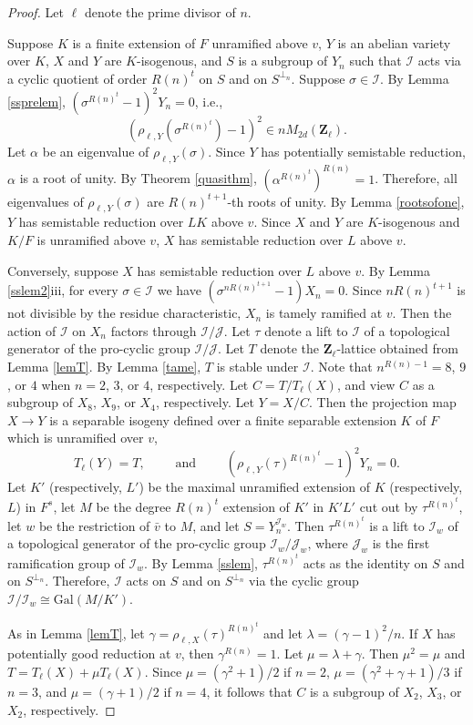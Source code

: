 \documentclass{amsart}
\def\Z{{\mathbf Z}}
\def\R{{\mathbf R}}
\def\Gal{\mathrm{Gal}}
\def\I{{\mathcal I}}
\def\J{{\mathcal J}}
\def\R{R}
\theoremstyle{definition}
\begin{document}
\begin{proof}
Let $\ell$ denote the prime divisor of $n$.

Suppose $K$ is a finite extension of $F$ unramified above $v$,
$Y$ is an abelian variety over $K$, $X$ and $Y$ are $K$-isogenous, and 
$S$ is a subgroup of $Y_n$ such that
$\I$ acts via a cyclic quotient of order $\R(n)^t$ on $S$ and 
on $S^{\perp_n}$. Suppose $\sigma \in \I$. 
By Lemma \ref{ssprelem}, $(\sigma^{\R(n)^t}-1)^2Y_n = 0$, i.e.,
$$(\rho_{\ell,Y}(\sigma^{\R(n)^t})-1)^2 \in nM_{2d}(\Z_\ell).$$
Let $\alpha$ be an eigenvalue of $\rho_{\ell,Y}(\sigma)$.
Since $Y$ has potentially semistable reduction, $\alpha$ is a root
of unity. 
By Theorem \ref{quasithm}, $(\alpha^{\R(n)^t})^{\R(n)} = 1$.
Therefore, all eigenvalues of $\rho_{\ell,Y}(\sigma)$ are 
${\R(n)}^{t+1}$-th
roots of unity. By Lemma \ref{rootsofone}, $Y$ has semistable reduction
over $LK$ above $v$. Since $X$ and $Y$ are $K$-isogenous and
$K/F$ is unramified above $v$, 
$X$ has semistable reduction over $L$ above $v$. 

Conversely, suppose $X$ has semistable reduction over $L$ above $v$.
By Lemma \ref{sslem2}iii, 
for every $\sigma \in \I$ we have
$(\sigma^{nR(n)^{t+1}}-1)X_n = 0$.
Since $nR(n)^{t+1}$ is 
not divisible by the residue characteristic, 
$X_n$ is tamely ramified at $v$. Then the
action of $\I$ on $X_n$ factors through $\I/\J$. 
Let $\tau$ denote a lift to $\I$ of a topological generator of the 
pro-cyclic group $\I/\J$. 
Let $T$ denote the $\Z_\ell$-lattice obtained from Lemma \ref{lemT}.
By Lemma \ref{tame}, $T$ is stable under $\I$. 
Note that $n^{R(n)-1} = 8$, $9$, or $4$ when
$n = 2$, $3$, or $4$, respectively.
Let $C = T/T_\ell(X)$, and 
view $C$ as a subgroup of 
$X_8$, $X_9$, or $X_4$, respectively. 
Let $Y = X/C$.
Then the projection map $X \to Y$ is a separable isogeny defined 
over a finite separable extension $K$ of $F$
which is unramified over $v$, 
$$T_\ell(Y) = T, \qquad \text{ and } \qquad 
(\rho_{\ell,Y}(\tau)^{\R(n)^t}-1)^2Y_n = 0.$$
Let $K'$ (respectively, $L'$) be the maximal unramified extension 
of $K$ (respectively, $L$) in $F^{s}$,  
let $M$ be the degree ${\R(n)^t}$ extension of $K'$ in $K'L'$ cut out by 
$\tau^{\R(n)^t}$, let $w$ be the restriction of ${\bar v}$ to $M$, 
and let $S = Y_n^{\I_w}$. 
Then $\tau^{\R(n)^t}$ is a lift to 
$\I_w$ of a topological generator of the pro-cyclic group
$\I_w/\J_w$, where $\J_w$ is the first ramification group of $\I_w$.
By Lemma \ref{sslem}, $\tau^{\R(n)^t}$ acts as the identity on
$S$ and on $S^{\perp_n}$. Therefore, $\I$ acts on $S$ and on 
$S^{\perp_n}$ via the cyclic group $\I/\I_w \cong \Gal(M/K')$.

As in Lemma \ref{lemT}, let $\gamma = \rho_{\ell,X}(\tau)^{\R(n)^t}$ 
and let $\lambda = (\gamma - 1)^2/n$.
If $X$ has potentially good reduction at $v$, then
$\gamma^{R(n)} = 1$. 
Let $\mu = \lambda + \gamma$.
Then $\mu^2 = \mu$ and $T = T_\ell(X) + \mu T_\ell(X)$.
Since $\mu = (\gamma^2 + 1)/2$ if $n = 2$, 
$\mu = (\gamma^2+\gamma+1)/3$ if $n = 3$, and 
$\mu = (\gamma + 1)/2$ if $n = 4$, 
it follows that 
$C$ is a subgroup of $X_2$, $X_3$, or $X_2$, respectively.
\end{proof}
\end{document}
